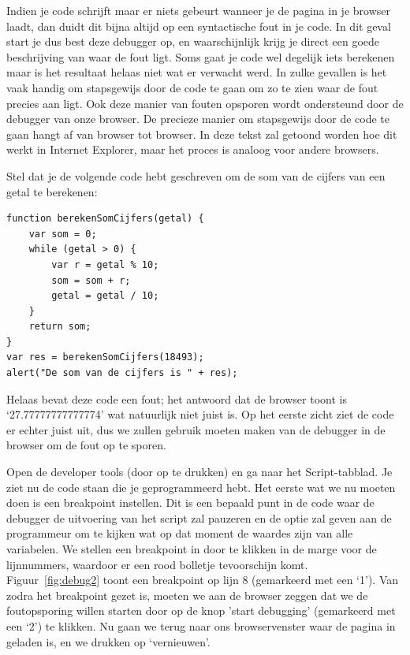 Indien je code schrijft maar er niets gebeurt wanneer je de pagina in je browser laadt, dan duidt dit bijna altijd op een syntactische fout in je code. In dit geval start je dus best deze debugger op, en waarschijnlijk krijg je direct een goede beschrijving van waar de fout ligt.
Soms gaat je code wel degelijk iets berekenen maar is het resultaat helaas niet wat er verwacht werd. In zulke gevallen is het vaak handig om stapsgewijs door de code te gaan om zo te zien waar de fout precies aan ligt. Ook deze manier van fouten opsporen wordt ondersteund door de debugger van onze browser. De precieze manier om stapsgewijs door de code te gaan hangt af van browser tot browser. In deze tekst zal getoond worden hoe dit werkt in Internet Explorer, maar het proces is analoog voor andere browsers.

Stel dat je de volgende code hebt geschreven om de som van de cijfers van een getal te berekenen:

\begin{minipage}{\linewidth}
\lstset{language=JavaScript,basicstyle=\small}
\begin{lstlisting}
function berekenSomCijfers(getal) {
    var som = 0;
    while (getal > 0) {
        var r = getal % 10;
        som = som + r;
        getal = getal / 10;
    }
    return som;
}
var res = berekenSomCijfers(18493);
alert("De som van de cijfers is " + res);
\end{lstlisting}
\end{minipage}

Helaas bevat deze code een fout; het antwoord dat de browser toont is `27.77777777777774' wat natuurlijk niet juist is. Op het eerste zicht ziet de code er echter juist uit, dus we zullen gebruik moeten maken van de debugger in de browser om de fout op te sporen.

Open de developer tools (door op  te drukken) en ga naar het Script-tabblad. Je ziet nu de code staan die je geprogrammeerd hebt. Het eerste wat we nu moeten doen is een breakpoint instellen. Dit is een bepaald punt in de code waar de debugger de uitvoering van het script zal pauzeren en de optie zal geven aan de programmeur om te kijken wat op dat moment de waardes zijn van alle variabelen. We stellen een breakpoint in door te klikken in de marge voor de lijnnummers, waardoor er een rood bolletje tevoorschijn komt. Figuur~\ref{fig:debug2} toont een breakpoint op lijn 8 (gemarkeerd met een `1'). Van zodra het breakpoint gezet is, moeten we aan de browser zeggen dat we de foutopsporing willen starten door op de knop 'start debugging' (gemarkeerd met een `2') te klikken. Nu gaan we terug naar ons browservenster waar de pagina in geladen is, en we drukken op `vernieuwen'.

